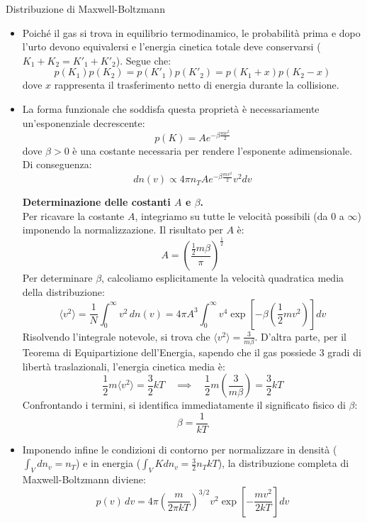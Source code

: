 \documentclass[openany,a4paper,12pt]{book}
\theoremstyle{remark}
\begin{document}
\begin{bressan}{Distribuzione di Maxwell-Boltzmann}
\begin{itemize}
    \item Poiché il gas si trova in equilibrio termodinamico, le probabilità prima e dopo l'urto devono equivalersi e l'energia cinetica totale deve conservarsi ($K_1 + K_2 = K'_1 + K'_2$). Segue che:
    \[
        p(K_1)p(K_2) = p(K'_1)p(K'_2) = p(K_1+x)p(K_2-x)
    \]
    dove $x$ rappresenta il trasferimento netto di energia durante la collisione.
    
    \item La forma funzionale che soddisfa questa proprietà è necessariamente un'esponenziale decrescente:
    \[
        p(K) = A e^{-\beta \frac{mv^2}{2}}
    \]
    dove $\beta > 0$ è una costante necessaria per rendere l'esponente adimensionale. Di conseguenza:
    \[ 
        dn(v) \propto 4 \pi n_T A e^{-\beta \frac{mv^2}{2}} v^2 dv
    \] 

    \begin{nota}
        \textbf{Determinazione delle costanti $A$ e $\beta$.}\\
        Per ricavare la costante $A$, integriamo su tutte le velocità possibili (da $0$ a $\infty$) imponendo la normalizzazione. Il risultato per $A$ è:
        \[
            A = \left( \frac{\frac{1}{2}m\beta}{\pi}\right)^\frac{1}{2}
        \]
        Per determinare $\beta$, calcoliamo esplicitamente la velocità quadratica media della distribuzione:
        \begin{equation*}
            \langle v^2 \rangle = \frac{1}{N} \int_0^\infty v^2 \, dn(v) = 4\pi A^3 \int_0^\infty v^4 \exp \left[ -\beta \left( \frac{1}{2} mv^2 \right) \right] dv
        \end{equation*}
        Risolvendo l'integrale notevole, si trova che $\langle v^2 \rangle = \frac{3}{m\beta}$.
        D'altra parte, per il Teorema di Equipartizione dell'Energia, sapendo che il gas possiede 3 gradi di libertà traslazionali, l'energia cinetica media è:
        \[
            \frac{1}{2} m \langle v^2 \rangle = \frac{3}{2} k T \quad \implies \quad \frac{1}{2} m \left(\frac{3}{m\beta}\right) = \frac{3}{2} k T
        \]
        Confrontando i termini, si identifica immediatamente il significato fisico di $\beta$:
        \[
            \beta = \frac{1}{k T}
        \]
    \end{nota} 
    
    \item Imponendo infine le condizioni di contorno per normalizzare in densità ($\int_{V} dn_v = n_T$) e in energia ($\int_{V}K dn_v=\frac{3}{2}n_T k T$), la distribuzione completa di Maxwell-Boltzmann diviene:
    \[
        p(v) \, dv = 4\pi \left( \frac{m}{2\pi k T} \right)^{3/2} v^2 \exp \left[ -\frac{mv^2}{2kT} \right] dv
    \]
    

\end{itemize}
\end{bressan}
\end{document}
